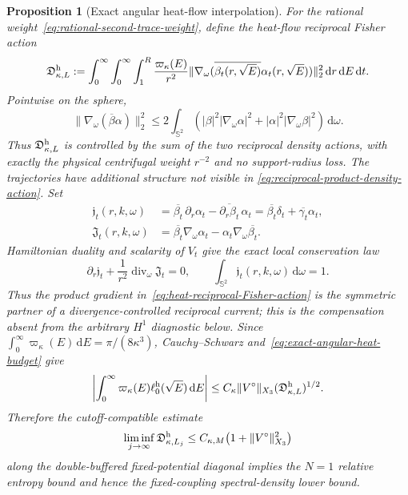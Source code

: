 \documentclass[11pt]{article}
\newcommand{\dd}{\,\mathrm d}
\newtheorem{proposition}[theorem]{Proposition}
\theoremstyle{definition}
\theoremstyle{remark}
\begin{document}
\begin{proposition}[Exact angular heat-flow interpolation]
For the rational weight~\eqref{eq:rational-second-trace-weight}, define the
heat-flow reciprocal Fisher action
\begin{equation}
 \mathfrak D_{\kappa,L}^{\rm h}
 :=\int_0^\infty\int_0^\infty\int_1^R
   \frac{\varpi_\kappa(E)}{r^2}
   \|\nabla_\omega(
     \overline{\beta_t(r,\sqrt E)}\alpha_t(r,\sqrt E))\|_2^2
   \dd r\dd E\dd t.
 \label{eq:heat-reciprocal-Fisher-action}
\end{equation}
Pointwise on the sphere,
\begin{equation}
 \|\nabla_\omega(\overline\beta\alpha)\|_2^2
 \leq2\int_{\mathbb S^2}
  \left(|\beta|^2|\nabla_\omega\alpha|^2
       +|\alpha|^2|\nabla_\omega\beta|^2\right)\dd\omega.
 \label{eq:reciprocal-product-density-action}
\end{equation}
Thus $\mathfrak D_{\kappa,L}^{\rm h}$ is controlled by the sum of the two
reciprocal density actions, with exactly the physical centrifugal weight
$r^{-2}$ and no support-radius loss.
The trajectories have additional structure not visible in
\eqref{eq:reciprocal-product-density-action}.  Set
\begin{align}
 \mathfrak j_t(r,k,\omega)
 &=\overline{\beta_t}\,\partial_r\alpha_t
   -\overline{\partial_r\beta_t}\,\alpha_t
   =\overline{\beta_t}\delta_t+\overline{\gamma_t}\alpha_t,
 \label{eq:reciprocal-Wronskian-density}\\
 \mathfrak J_t(r,k,\omega)
 &=\overline{\beta_t}\nabla_\omega\alpha_t
   -\alpha_t\nabla_\omega\overline{\beta_t}.
 \label{eq:reciprocal-angular-current}
\end{align}
Hamiltonian duality and scalarity of $V_t$ give the exact local conservation
law
\begin{equation}
 \partial_r\mathfrak j_t
 +\frac1{r^2}\operatorname{div}_\omega\mathfrak J_t=0,
 \qquad
 \int_{\mathbb S^2}\mathfrak j_t(r,k,\omega)\dd\omega=1.
 \label{eq:reciprocal-local-Wronskian-law}
\end{equation}
Thus the product gradient in~\eqref{eq:heat-reciprocal-Fisher-action} is the
symmetric partner of a divergence-controlled reciprocal current; this is the
compensation absent from the arbitrary $H^1$ diagnostic below.
Since $\int_0^\infty\varpi_\kappa(E)\dd E=\pi/(8\kappa^3)$,
Cauchy--Schwarz and~\eqref{eq:exact-angular-heat-budget} give
\begin{equation}
 \left|\int_0^\infty\varpi_\kappa(E)
       \ell_0^{\rm h}(\sqrt E)\dd E\right|
 \leq C_\kappa\|V^\circ\|_{X_3}
      (\mathfrak D_{\kappa,L}^{\rm h})^{1/2}.
 \label{eq:heat-flow-entropy-Fisher-bound}
\end{equation}
Therefore the cutoff-compatible estimate
\begin{equation}
 \liminf_{j\to\infty}\mathfrak D_{\kappa,L_j}^{\rm h}
 \leq C_{\kappa,M}\bigl(1+\|V^\circ\|_{X_3}^2\bigr)
 \label{eq:HFI1}
\end{equation}
along the double-buffered fixed-potential diagonal implies the $N=1$ relative
entropy bound and hence the fixed-coupling spectral-density lower bound.
\end{proposition}
\end{document}
